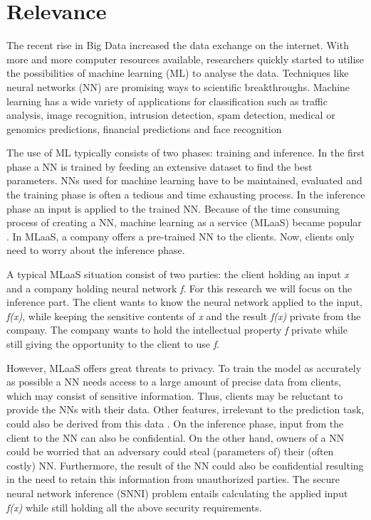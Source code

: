 \documentclass[../thesis.tex]{subfiles}
\begin{document}
\section{Relevance}
The recent rise in Big Data increased the data exchange on the internet. With more and more computer resources available, researchers quickly started to utilise the possibilities of machine learning (ML) to analyse the data.  Techniques like neural networks (NN) are promising ways to scientific breakthroughs. Machine learning has a wide variety of applications for classification such as traffic analysis, image recognition, intrusion detection,  spam detection, medical or genomics predictions,  financial predictions and face recognition \parencite{Dowlin2017, Islam2011, Bachrach16, Kaiming215}

The use of ML typically consists of two phases: training and inference. In the first phase a NN is trained by feeding an extensive dataset to find the best parameters. NNs used for machine learning have to be maintained, evaluated and the training phase is often a tedious and time exhausting process. In the inference phase an input is applied to the trained NN. Because of the time consuming process of creating a NN, machine learning as a service (MLaaS) became popular \parencite{Ribeiro2015MLaaSML}. In MLaaS, a company offers a pre-trained NN to the clients. Now, clients only need to worry about the inference phase.

A typical MLaaS situation consist of two parties: the client holding an input \textit{x} and a company holding neural network \textit{f}. For this research we will focus on the inference part. The client wants to know the neural network applied to the input, \textit{f(x)}, while keeping the sensitive contents of \textit{x} and the result \textit{f(x)} private from the company. The company wants to hold the intellectual property \textit{f} private while still giving the opportunity to the client to use \textit{f}. 

However, MLaaS offers great threats to privacy. To train the model as accurately as possible a NN needs access to a large amount of precise data from clients, which may consist of sensitive information. Thus, clients may be reluctant to provide the NNs with their data. Other features, irrelevant to the prediction task, could also be derived from this data \parencite{Nasr2019}. On the inference phase, input from the client to the NN can also be confidential. On the other hand, owners of a NN could be worried that an adversary could steal (parameters of) their (often costly) NN. Furthermore, the result of the NN could also be confidential resulting in the need to retain this information from unauthorized parties. The secure neural network inference (SNNI) problem entails calculating the applied input \textit{f(x)} while still holding all the above security requirements. 
\end{document}

